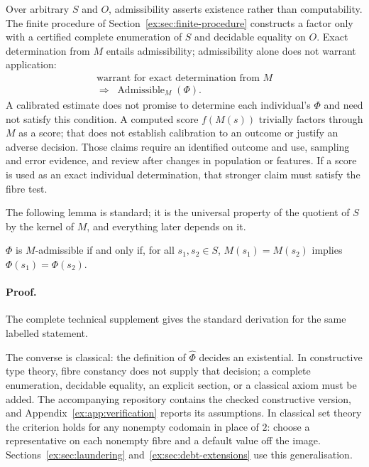\documentclass[twocolumn,envcountsect,envcountsame,natbib]{svjour3}
\begin{document}
Over arbitrary $S$ and $O$, admissibility asserts existence rather than computability. The finite procedure of Section~\ref{ex:sec:finite-procedure} constructs a factor only with a certified complete enumeration of $S$ and decidable equality on $O$. Exact determination from $M$ entails admissibility; admissibility alone does not warrant application:
\[
\begin{gathered}\text{warrant for exact determination from $M$}\\\Longrightarrow\;\operatorname{Admissible}_M(\Phi).\end{gathered}
\]
A calibrated estimate does not promise to determine each individual's $\Phi$ and need not satisfy this condition. A computed score $f(M(s))$ trivially factors through $M$ as a score; that does not establish calibration to an outcome or justify an adverse decision. Those claims require an identified outcome and use, sampling and error evidence, and review after changes in population or features. If a score is used as an exact individual determination, that stronger claim must satisfy the fibre test.

The following lemma is standard; it is the universal property of the quotient of $S$ by the kernel of $M$, and everything later depends on it.

\begin{lemma}\label{ex:prop:fibre}
$\Phi$ is $M$-admissible if and only if, for all $s_1,s_2 \in S$, $M(s_1)=M(s_2)$ implies $\Phi(s_1)=\Phi(s_2)$.
\end{lemma}

\paragraph{Proof.} The complete technical supplement gives the standard derivation for the same labelled statement.

\begin{remark}
The converse is classical: the definition of $\widehat\Phi$ decides an existential. In constructive type theory, fibre constancy does not supply that decision; a complete enumeration, decidable equality, an explicit section, or a classical axiom must be added. The accompanying repository contains the checked constructive version, and Appendix~\ref{ex:app:verification} reports its assumptions. In classical set theory the criterion holds for any nonempty codomain in place of $2$: choose a representative on each nonempty fibre and a default value off the image. Sections~\ref{ex:sec:laundering} and~\ref{ex:sec:debt-extensions} use this generalisation.
\end{remark}
\end{document}
